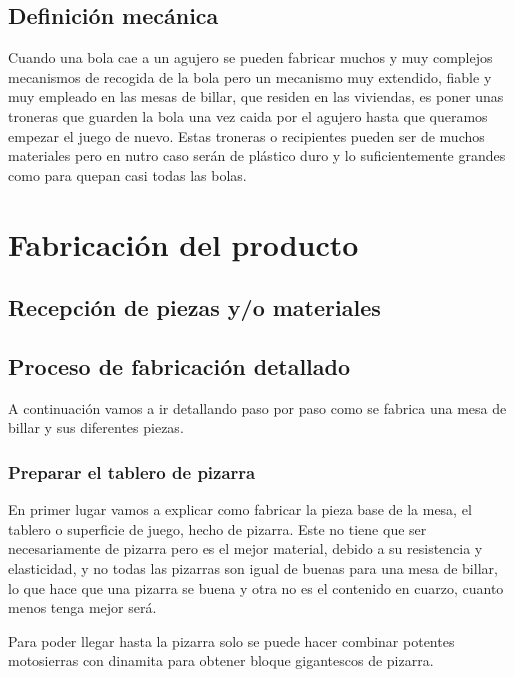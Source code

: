 		    

	\subsection {Definición mecánica}
		    Cuando una bola cae a un agujero se pueden fabricar muchos y muy complejos mecanismos de recogida de la bola pero un mecanismo muy extendido,
		    fiable y muy empleado en las mesas de billar, que residen en las viviendas, es poner unas troneras que guarden la bola una vez caida por el agujero hasta que queramos empezar
		    el juego de nuevo. Estas troneras o recipientes pueden ser de muchos materiales pero en nutro caso serán de plástico duro y lo suficientemente grandes como para quepan casi todas las bolas. 
\section {Fabricación del producto}

	\subsection {Recepción de piezas y/o materiales}

	\subsection {Proceso de fabricación detallado}
		A  continuación vamos a  ir detallando paso por paso como se fabrica una mesa de billar y sus diferentes piezas.
		
		\subsubsection {Preparar el tablero de pizarra}
			En primer lugar vamos a explicar como fabricar la pieza base de la mesa, el tablero o superficie de juego, hecho de pizarra. Este no tiene que ser necesariamente de pizarra pero es el mejor material, debido a  su resistencia y elasticidad, y no todas las pizarras son igual de buenas para una mesa de billar, lo que hace que una pizarra se buena y otra no es el contenido en cuarzo, cuanto menos tenga mejor será.

Para poder llegar hasta la pizarra solo se puede hacer combinar potentes motosierras con dinamita para obtener bloque gigantescos de pizarra.

